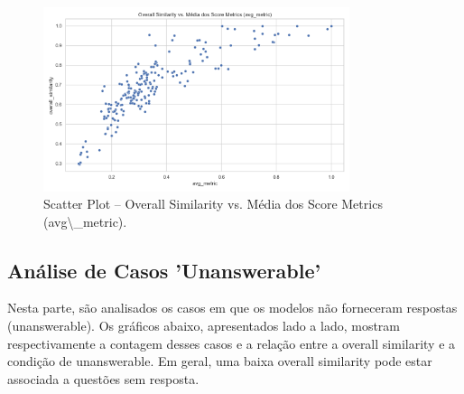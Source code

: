 \documentclass{article}%
\begin{document}
\begin{figure}[H]%
\centering%
\includegraphics[width=0.8\textwidth]{analysis_results/scatter_overall_vs_avg_metric.png}%
\caption{Scatter Plot – Overall Similarity vs. Média dos Score Metrics (avg\textbackslash{}\_metric).}%
\end{figure}

%
\subsection*{Análise de Casos 'Unanswerable'}%
\label{subsec:AnlisedeCasosUnanswerable}%
Nesta parte, são analisados os casos em que os modelos não forneceram respostas (unanswerable). Os gráficos abaixo, apresentados lado a lado, mostram respectivamente a contagem desses casos e a relação entre a overall similarity e a condição de unanswerable. Em geral, uma baixa overall similarity pode estar associada a questões sem resposta.%
\end{document}
